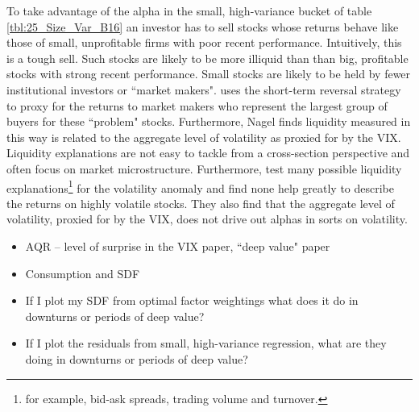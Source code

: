 To take advantage of the alpha in the small, high-variance bucket of table
\ref{tbl:25_Size_Var_B16} an investor has to sell stocks whose returns behave
like those of small, unprofitable firms with poor recent performance.
Intuitively, this is a tough sell.
Such stocks are likely to be more illiquid than than big, profitable stocks
with strong recent performance.
Small stocks are likely to be held by fewer institutional investors or
``market makers".
\textcite{nagel2012evaporating} uses the short-term reversal strategy to proxy
for the returns to market makers who represent the largest group of buyers for
these ``problem" stocks.
Furthermore, Nagel finds liquidity measured in this way is related to the
aggregate level of volatility as proxied for by the VIX.
Liquidity explanations are not easy to tackle from a cross-section
perspective and often focus on market microstructure.
Furthermore, \textcite{ang2006cross} test many possible liquidity
explanations\footnote{for example, bid-ask spreads, trading volume and
turnover.} for the volatility anomaly and find none help greatly to describe
the returns on highly volatile stocks.
They also find that the aggregate level of volatility, proxied for by the VIX,
does not drive out alphas in sorts on volatility.

\textcite{asness2018deep} 


\begin{itemize}
  \item AQR -- level of surprise in the VIX paper, ``deep value" paper
  \item Consumption and SDF
  \item If I plot my SDF from optimal factor weightings what does it do in
  downturns or periods of deep value?
  \item If I plot the residuals from small, high-variance regression, what are
  they doing in downturns or periods of deep value?
\end{itemize}
